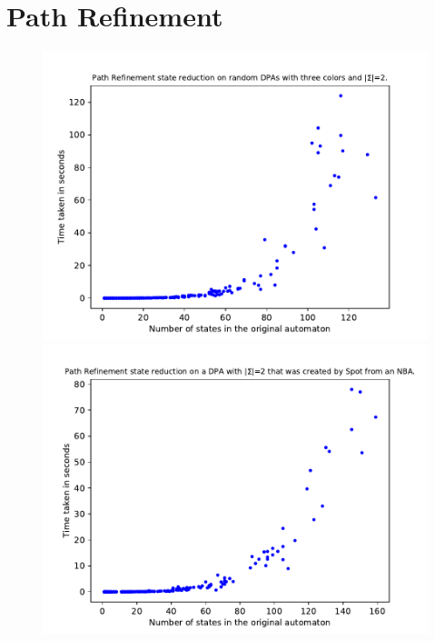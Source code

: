 \section{Path Refinement}
\begin{figure}
	\centering
	\begin{minipage}{0.49\textwidth}
		\includegraphics[page=6,height=.3\textheight]{../data/analysis/path_refinement/gendet_ap1.pdf} 
		\includegraphics[page=6,height=.3\textheight]{../data/analysis/path_refinement/detspot_ap1.pdf} 

\end{minipage}
\end{figure}
